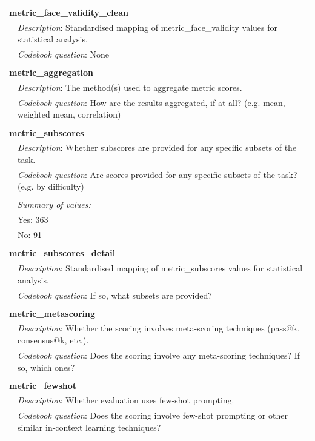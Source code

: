 {\begin{longtable}{p{}p{}}
\multicolumn{2}{l}{\textbf{metric\_face\_validity\_clean}} \\
& \textit{Description}: Standardised mapping of metric\_face\_validity values for statistical analysis. \\
& \textit{Codebook question}: None \\
\\
\multicolumn{2}{l}{\textbf{metric\_aggregation}} \\
& \textit{Description}: The method(s) used to aggregate metric scores. \\
& \textit{Codebook question}: How are the results aggregated, if at all? (e.g. mean, weighted mean, correlation) \\
\\
\multicolumn{2}{l}{\textbf{metric\_subscores}} \\
& \textit{Description}: Whether subscores are provided for any specific subsets of the task. \\
& \textit{Codebook question}: Are scores provided for any specific subsets of the task? (e.g. by difficulty) \\
\\
& \textit{Summary of values:} \\
& Yes: 363 \\
& No: 91 \\
\\
\multicolumn{2}{l}{\textbf{metric\_subscores\_detail}} \\
& \textit{Description}: Standardised mapping of metric\_subscores values for statistical analysis. \\
& \textit{Codebook question}: If so, what subsets are provided? \\
\\
\multicolumn{2}{l}{\textbf{metric\_metascoring}} \\
& \textit{Description}: Whether the scoring involves meta-scoring techniques (pass@k, consensus@k, etc.). \\
& \textit{Codebook question}: Does the scoring involve any meta-scoring techniques? If so, which ones? \\
\\
\multicolumn{2}{l}{\textbf{metric\_fewshot}} \\
& \textit{Description}: Whether evaluation uses few-shot prompting. \\
& \textit{Codebook question}: Does the scoring involve few-shot prompting or other similar in-context learning techniques? \\

\end{longtable}}
